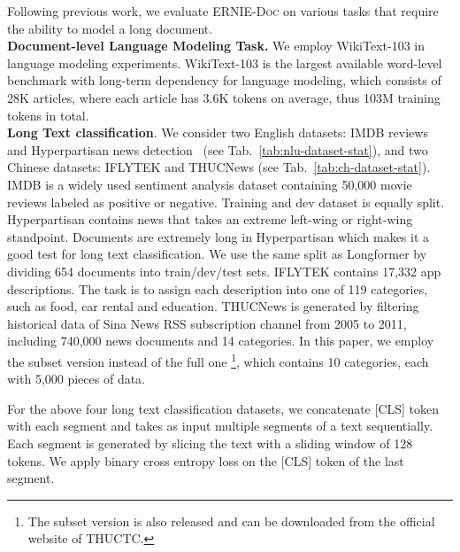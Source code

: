 \documentclass[11pt,a4paper]{article}
\newcommand{\mname}{\textsc{ERNIE-Doc}\xspace}
\begin{document}
Following previous work, we evaluate \mname on various tasks that require the ability to model a long document.
\\

\noindent \textbf{Document-level Language Modeling Task.} We employ WikiText-103 \citep{wikitext} in language modeling experiments. WikiText-103 is the largest available word-level benchmark with long-term dependency for language modeling, which consists of 28K articles, where each article has 3.6K tokens on average, thus 103M training tokens in total.
\\

\noindent \textbf{Long Text classification}. We consider two English datasets: IMDB reviews ~\citep{maas2011learning} and Hyperpartisan news detection~\citep{kiesel2019semeval} (see Tab.~\ref{tab:nlu-dataset-stat}), and two Chinese datasets: IFLYTEK \citep{iflytek} and THUCNews \citep{thucnews} (see Tab.~\ref{tab:ch-dataset-stat}). 
IMDB is a widely used sentiment analysis dataset containing 50,000 movie reviews labeled as positive or negative. Training and dev dataset is equally split. 
Hyperpartisan contains news that takes an extreme left-wing or right-wing standpoint. Documents are extremely long in Hyperpartisan which makes it a good test for long text classification. We use the same split as Longformer by dividing 654 documents into train/dev/test sets.
IFLYTEK contains 17,332 app descriptions. The task is to assign each description into one of 119 categories, such as food, car rental and education.
THUCNews is generated by filtering historical data of Sina News RSS subscription channel from 2005 to 2011, including 740,000 news documents and 14 categories. In this paper, we employ the subset version instead of the full one \footnote{The subset version is also released and can be downloaded from the official website of THUCTC.}, which contains 10 categories, each with 5,000 pieces of data.



For the above four long text classification datasets, we concatenate [CLS] token with each segment and takes as input multiple segments of a text sequentially. Each segment is generated by slicing the text with a sliding window of 128 tokens. We apply binary cross entropy loss on the [CLS] token of the last segment.
\\
\end{document}
